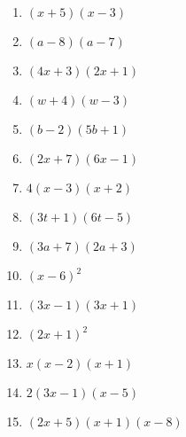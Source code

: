 \begin{enumerate}
	\item $(x+5)(x-3)$
    \item $(a-8)(a-7)$
    \item $(4x+3)(2x+1)$
    \item $(w+4)(w-3)$
	\item $(b-2)(5b+1)$
    \item $(2x+7)(6x-1)$
    \item $4(x-3)(x+2)$
    \item $(3t+1)(6t-5)$
    \item $(3a+7)(2a+3)$
    \item $(x-6)^2$
    \item $(3x-1)(3x+1)$
    \item $(2x+1)^2$
    \item $x(x-2)(x+1)$
    \item $2(3x-1)(x-5)$
    \item $(2x+5)(x+1)(x-8)$
\end{enumerate}